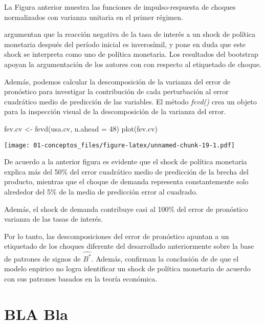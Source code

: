 \documentclass[
]{book}
\newenvironment{Shaded}{\begin{snugshade}}{\end{snugshade}}
\newcommand{\AttributeTok}[1]{\textcolor[rgb]{0.77,0.63,0.00}{#1}}
\newcommand{\DecValTok}[1]{\textcolor[rgb]{0.00,0.00,0.81}{#1}}
\newcommand{\FunctionTok}[1]{\textcolor[rgb]{0.00,0.00,0.00}{#1}}
\newcommand{\NormalTok}[1]{#1}
\newcommand{\OtherTok}[1]{\textcolor[rgb]{0.56,0.35,0.01}{#1}}
\begin{document}
La Figura anterior muestra las funciones de impulso-respuesta de choques normalizados con varianza unitaria en el primer régimen.

\citet{Herwartz2016} argumentan que la reacción negativa de la tasa de interés a un shock de política monetaria después del período inicial es inverosímil, y pone en duda que este shock se interpreta como uno de política monetaria. Los resultados del bootstrap apoyan la argumentación de los autores con
con respecto al etiquetado de choque.

Además, podemos calcular la descomposición de la varianza del error de pronóstico para investigar la contribución de cada perturbación al error cuadrático medio de predicción de las variables. El método \emph{fevd()}
crea un objeto para la inspección visual de la descomposición de la varianza del error.

\begin{Shaded}
\begin{Highlighting}[]
\NormalTok{fev.cv }\OtherTok{\textless{}{-}} \FunctionTok{fevd}\NormalTok{(usa.cv, }\AttributeTok{n.ahead =} \DecValTok{48}\NormalTok{)}
\FunctionTok{plot}\NormalTok{(fev.cv)}
\end{Highlighting}
\end{Shaded}

\texttt{[image: 01-conceptos\_files/figure-latex/unnamed-chunk-19-1.pdf]}

De acuerdo a la anterior figura es evidente que el shock de política monetaria explica más del 50\% del error cuadrático medio de predicción de la brecha del producto, mientras que el choque de demanda representa constantemente solo alrededor del 5\% de la media de predicción
error al cuadrado.

Además, el shock de demanda contribuye casi al 100\% del error de pronóstico
varianza de las tasas de interés.

Por lo tanto, las descomposiciones del error de pronóstico apuntan a un
etiquetado de los choques diferente del desarrollado anteriormente sobre la base de patrones de signos de \(\hat{B^{*}}\). Además, confirman la conclusión de \citet{Herwartz2016} de que el modelo enpirico no logra identificar un shock de política monetaria de acuerdo con sus patrones basados en la teoría económica.

\hypertarget{bla-bla}{%
\section{BLA Bla}\label{bla-bla}}
\end{document}
